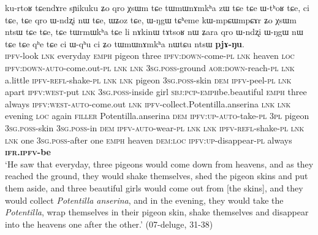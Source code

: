 \begin{exe}
\ex \label{ex:chain.pjANu}
\gll ku-rtoʁ tɕendɤre sɲikuku ʑo qro χsɯm  tɕe tɯmɯnɤmkʰa zɯ  tɕe  tɕe ɯ-tʰoʁ  tɕe, ci  tɕe, tɕe qro ɯ-ndʐi nɯ  tɕe, ɯʑoz  tɕe, ɯ-ŋgɯ tɕʰeme kɯ-mpɕɯ\redp{}mpɕɤr ʑo χsɯm ntsɯ  tɕe  tɕe, tɕe tɯrmɯkʰa tɕe li nɤkinɯ tɤtsoʁ nɯ  ʑara qro ɯ-ndʐi ɯ-ŋgɯ nɯ  tɕe tɕe  qʰe tɕe ci ɯ-qʰu ci ʑo tɯmɯnɤmkʰa nɯtɕu  ntsɯ \textbf{pjɤ-ŋu}. \\
\textsc{ipfv}-look \textsc{lnk} everyday \textsc{emph} pigeon three \textsc{ipfv}:\textsc{down}-come-\textsc{pl} \textsc{lnk} heaven \textsc{loc} \textsc{ipfv}:\textsc{down}-\textsc{auto}-come.out-\textsc{pl} \textsc{lnk} \textsc{lnk}  \textsc{3sg}.\textsc{poss}-ground \textsc{aor}:\textsc{down}-reach-\textsc{pl} \textsc{lnk} a.little \textsc{ipfv}-\textsc{refl}-shake-\textsc{pl} \textsc{lnk} \textsc{lnk} pigeon \textsc{3sg}.\textsc{poss}-skin \textsc{dem} \textsc{ipfv}-peel-\textsc{pl} \textsc{lnk} apart \textsc{ipfv}:\textsc{west}-put \textsc{lnk} \textsc{3sg}.\textsc{poss}-inside girl \textsc{sbj}:\textsc{pcp}-\textsc{emph}\redp{}be.beautiful \textsc{emph} three always \textsc{ipfv}:\textsc{west}-\textsc{auto}-come.out \textsc{lnk} \textsc{ipfv}-collect.Potentilla.anserina \textsc{lnk} \textsc{lnk} evening \textsc{loc} again \textsc{filler} Potentilla.anserina \textsc{dem} \textsc{ipfv}:\textsc{up}-\textsc{auto}-take-\textsc{pl} \textsc{3pl} pigeon \textsc{3sg}.\textsc{poss}-skin \textsc{3sg}.\textsc{poss}-in \textsc{dem} \textsc{ipfv}-\textsc{auto}-wear-\textsc{pl} \textsc{lnk} \textsc{lnk}  \textsc{ipfv}-\textsc{refl}-shake-\textsc{pl} \textsc{lnk} \textsc{lnk} one \textsc{3sg}.\textsc{poss}-after one \textsc{emph} heaven \textsc{dem}:\textsc{loc} \textsc{ipfv}:\textsc{up}-disappear-\textsc{pl} always \textbf{\textsc{ifr}.\textsc{ipfv}-be}  \\
\glt `He saw that everyday, three pigeons would come down from heavens, and as they reached the ground, they would shake themselves, shed the pigeon skins and put them aside, and three beautiful girls would come out from [the skins], and they would collect \textit{Potentilla anserina}, and in the evening, they would take the \textit{Potentilla}, wrap themselves in their pigeon skin, shake themselves and disappear into the heavens one after the other.' (07-deluge, 31-38)
\end{exe}

